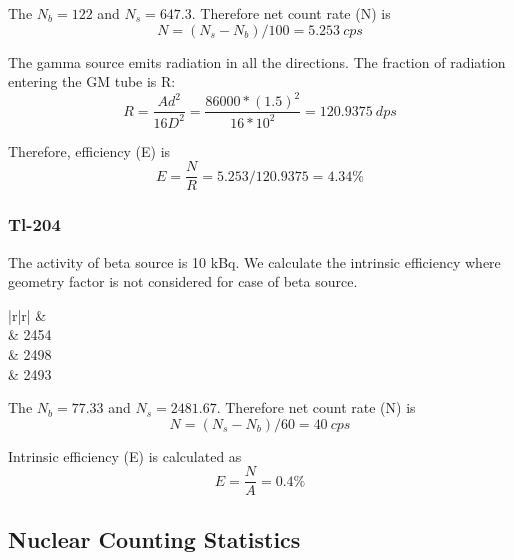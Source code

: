 \documentclass[a4paper, amsfonts, amssymb, amsmath, reprint, showkeys, nofootinbib, twoside]{revtex4-1}
\begin{document}
The $N_b=122$ and $N_s=647.3$. Therefore net count rate (N) is 
\begin{equation}
N=(N_s-N_b)/100=5.253~cps
\end{equation}

The gamma source emits radiation in all the directions. The fraction of radiation entering the GM tube is R:
\begin{equation}
	R=\frac{Ad^{2}}{16D^2}=\frac{86000*(1.5)^{2}}{16*10^2}=120.9375~dps
\end{equation}

Therefore, efficiency (E) is 
\begin{equation}
	E=\frac{N}{R}=5.253/120.9375= 4.34\%
\end{equation}


\subsubsection{Tl-204}
The activity of beta source is 10 kBq. We calculate the intrinsic efficiency where geometry factor is not considered for case of beta source.

\begin{table}[H]
	\centering
	\caption{Background count and count recording for 100s for Tl-204}
	\label{te2}
		\begin{tabular}{|r|r|}
			\hline
			 &  \\  & 2454 \\  & 2498 \\  & 2493 \\ \hline
		\end{tabular}	
\end{table}

The $N_b=77.33$ and $N_s=2481.67$. Therefore net count rate (N) is 
\begin{equation}
	N=(N_s-N_b)/60=40~cps
\end{equation}

Intrinsic efficiency (E) is calculated as  
\begin{equation}
	E=\frac{N}{A}=0.4\%
\end{equation}


\subsection{Nuclear Counting Statistics}
\end{document}

